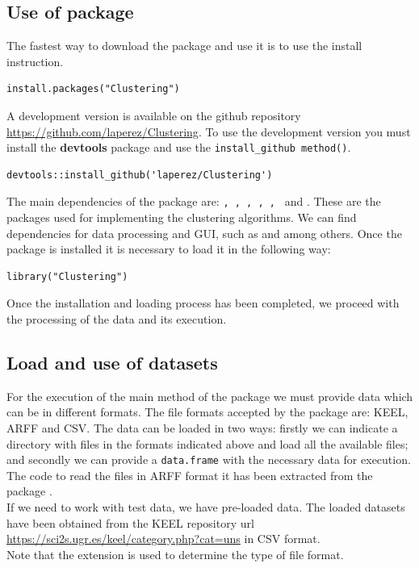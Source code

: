 \subsection{Use of  package}

The fastest way to download the  package and use it is to use the install instruction.

\begin{verbatim}
install.packages("Clustering")
\end{verbatim}
A development version is available on the github repository \url{https://github.com/laperez/Clustering}. To use the development version you must install the \textbf{devtools} package and use the \texttt{install\_github method()}.

\begin{verbatim}
devtools::install_github('laperez/Clustering')
\end{verbatim}
The main dependencies of the   package are: \texttt{,  \citep{R:lucas:2019}, , , , } \citep{R:rodrigues-vasconcelos-tinos-2019} and \texttt{} \citep{R:suzuki-terada-shimodaira:2019}. These are the packages used for implementing the clustering algorithms. We can find dependencies for data processing and GUI, such as \texttt{} and \texttt{} among others. Once the package is installed it is necessary to load it in the following way:

\begin{verbatim}
library("Clustering")
\end{verbatim}
Once the installation and loading process has been completed, we proceed with the processing of the data and its execution.

\subsection {Load and use of datasets}

For the execution of the main method of the package we must provide data which can be in different formats. The file formats accepted by the package are: KEEL, ARFF and CSV. The data can be loaded in two ways: firstly we can indicate a directory with files in the formats indicated above and load all the available files; and secondly we can provide a \texttt{data.frame} with the necessary data for execution. The code to read the files in ARFF format it has been extracted from the  package \citep{b55}.\\
If we need to work with test data, we have pre-loaded data. The loaded datasets have been obtained from the KEEL repository url \url{https://sci2s.ugr.es/keel/category.php?cat=uns} in CSV format.\\
Note that the extension is used to determine the type of file format.

